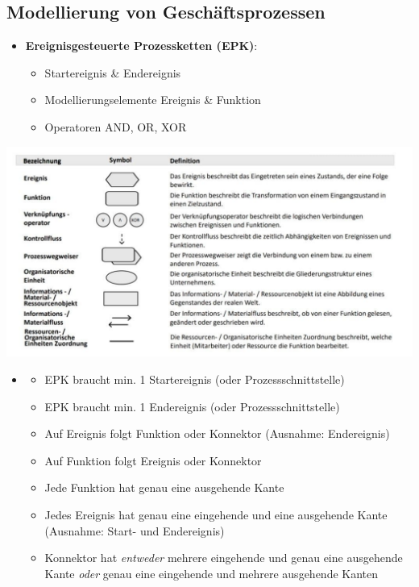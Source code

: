 \documentclass[12pt,a4paper]{article}
\begin{document}
\vspace{0.5cm}
\subsection{Modellierung von Geschäftsprozessen} %
\begin{itemize}
   \item \textbf{Ereignisgesteuerte Prozessketten (EPK)}:
       \begin{itemize}
		   \item Startereignis \& Endereignis
		   \item Modellierungselemente Ereignis \& Funktion
		   \item Operatoren AND, OR, XOR
		\end{itemize}
\end{itemize}

\vspace*{-0.8cm}
\begin{center}
    \includegraphics[width=1.05\textwidth]{digi2.jpg}
\end{center}

\begin{itemize}
\item []
   \begin{itemize}
      \item EPK braucht min. 1 Startereignis (oder Prozessschnittstelle)
	   \item EPK braucht min. 1 Endereignis (oder Prozessschnittstelle)
	   \item Auf Ereignis folgt Funktion oder Konnektor (Ausnahme: Endereignis)
	   \item Auf Funktion folgt Ereignis oder Konnektor
	   \item Jede Funktion hat genau eine ausgehende Kante
	   \item Jedes Ereignis hat genau eine eingehende und eine ausgehende Kante (Ausnahme: Start- und Endereignis)
	   \item Konnektor hat \textit{entweder} mehrere eingehende und genau eine ausgehende Kante 
	         \textit{oder} genau eine eingehende und mehrere ausgehende Kanten
   \end{itemize}
\end{itemize}
\end{document}
